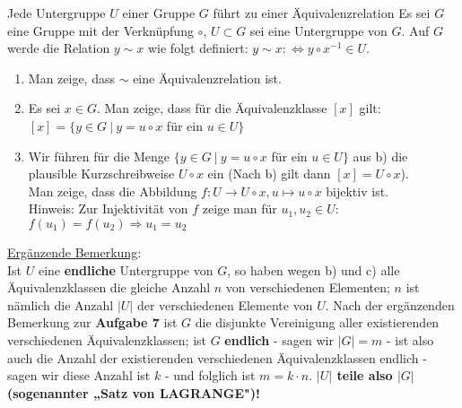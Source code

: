 \documentclass{uebblatt}
\begin{document}
\begin{aufgabe}{Jede Untergruppe $U$ einer Gruppe $G$ führt zu einer Äquivalenzrelation}
Es sei $G$ eine Gruppe mit der Verknüpfung $\circ$, $U \subset G$ sei eine Untergruppe von $G$. Auf $G$ werde die Relation $y \sim x$ wie folgt definiert: $y \sim x:\Leftrightarrow y \circ x^{-1} \in U$.
\begin{enumerate}
\item Man zeige, dass $\sim$ eine Äquivalenzrelation ist.
\item Es sei $x \in G$. Man zeige, dass für die Äquivalenzklasse $[x]$ gilt:\\
$[x] = \{y \in G \> | \> y = u \circ x$ für ein $u \in U\}$
\item Wir führen für die Menge $\{y \in G \> | \> y = u \circ x$ für ein $u \in U\}$ aus b) die plausible Kurzschreibweise $U \circ x$ ein (Nach b) gilt dann $[x] = U \circ x$).\\
Man zeige, dass die Abbildung $f:U \to U \circ x, u \mapsto u \circ x$ bijektiv ist.\\
Hinweis: Zur Injektivität von $f$ zeige man für $u_1, u_2 \in U$: $f(u_1) = f(u_2) \Rightarrow u_1 = u_2$
\end{enumerate}
\underline{Ergänzende Bemerkung}:\\
Ist $U$ eine \textbf{endliche} Untergruppe von $G$, so haben wegen b) und c) alle Äquivalenzklassen die gleiche Anzahl $n$ von verschiedenen Elementen; $n$ ist nämlich die Anzahl $|U|$ der verschiedenen Elemente von $U$. Nach der ergänzenden Bemerkung zur \textbf{Aufgabe 7} ist $G$ die disjunkte Vereinigung aller existierenden verschiedenen Äquivalenzklassen; ist $G$ \textbf{endlich} - sagen wir $|G| = m$ - ist also auch die Anzahl der existierenden verschiedenen Äquivalenzklassen endlich - sagen wir diese Anzahl ist $k$ - und folglich ist $m = k \cdot n$. \textbf{$|U|$ teile also $|G|$ (sogenannter „Satz von LAGRANGE")!}
\\ \\ \\ \\ \\ \\
\end{aufgabe}
\end{document}
